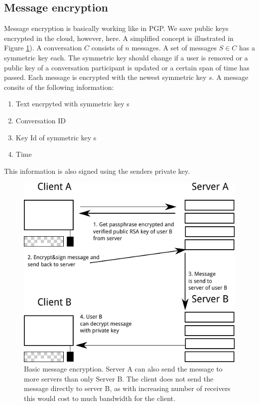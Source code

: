 \documentclass{scrartcl}
\begin{document}
 \subsection{Message encryption}
 

  
  Message encryption is basically working like in PGP. We save  public keys encrypted in the cloud, however, here. A simplified concept is illustrated in Figure \ref{fig2}). 
  A conversation $C$ consists of $n$ messages. A set of messages $S \in C$ has a symmetric key each. The symmetric key should change if a user is removed or a public key of a conversation participant is updated or a certain span of time has passed. Each message is encrypted with the newest symmetric key $s$.
  A message consits of the following information:
  
  
  \begin{enumerate}
\item Text encrpyted with symmetric key s
\item Conversation ID
\item Key Id of symmetric key s
\item Time
\end{enumerate}
This information is also signed using the senders private key.



 \begin{figure}[ht]
	\centering
  \includegraphics[]{pubkey.pdf}
	\caption{Basic message encryption. Server A can also send the message to more servers than only Server B. The client does not send the message directly to server B, as with increasing number of receivers this would cost to much bandwidth for the client.}
	\label{fig2}
\end{figure}
\end{document}
